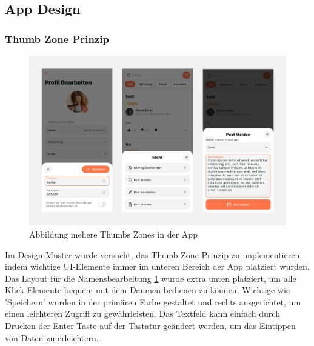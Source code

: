 \subsection{App Design}
\subsubsection{Thumb Zone Prinzip}

\begin{figure}[h]
  \centering
  \includegraphics[width=1\textwidth]{pics/thumb-zone.png}
  \caption{Abbildung mehere Thumbs Zones in der App}
  \label{fig:thumb-zone}
\end{figure}

Im Design-Muster wurde versucht, das Thumb Zone Prinzip zu
implementieren, indem wichtige UI-Elemente immer im unteren
Bereich der App platziert wurden. Das Layout für die
Namensbearbeitung \ref{fig:thumb-zone} wurde extra
unten platziert, um alle Klick-Elemente bequem mit dem
Daumen bedienen zu können. Wichtige
wie 'Speichern'
wurden in der primären Farbe gestaltet und rechts
ausgerichtet, um einen leichteren Zugriff zu gewährleisten.
Das Textfeld kann einfach durch Drücken der Enter-Taste auf
der Tastatur geändert werden, um das Eintippen von Daten zu
erleichtern.

